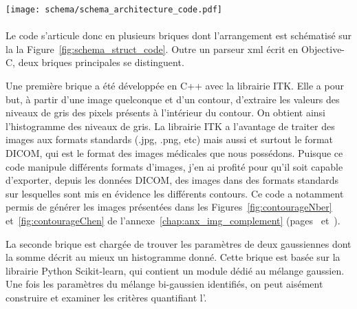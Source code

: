 \documentclass[main.tex]{subfiles}
\begin{document}
\begin{sidewaysfigure}
\centering
\vfill
\texttt{[image: schema/schema\_architecture\_code.pdf]} %
\caption{\label{fig:schema_struct_code}Schéma du code de calcul permettant la quantification de l'\hetero. Le code est très hétéroclite et fait intervenir plusieurs langages de programmation}
\end{sidewaysfigure}


\paragraph{}
Le code s'articule donc en plusieurs briques dont l'arrangement est schématisé sur la la Figure~\ref{fig:schema_struct_code}. Outre un parseur xml écrit en Objective-C, deux briques principales se distinguent. 


Une première brique a été développée en C++ avec la librairie ITK. 
Elle a pour but, à partir d'une image quelconque 
 et d'un contour, d'extraire les valeurs des niveaux de gris des pixels présents à l'intérieur du contour. On obtient ainsi l'histogramme des niveaux de gris. 
La librairie ITK a l'avantage de traiter des images aux formats standards (.jpg, .png, etc) mais aussi et surtout le format DICOM, qui est le format des images médicales que nous possédons. 
Puisque ce code manipule différents formats d'images, j'en ai profité pour qu'il soit capable d'exporter, depuis les données DICOM, des images dans des formats standards sur lesquelles sont mis en évidence les différents contours. 
Ce code a notamment permis de générer les images présentées dans les Figures~\ref{fig:contourageNber} et~\ref{fig:contourageChen} de l'annexe~\ref{chap:anx_img_complement} (pages~\pageref{fig:contourageNber}  et~\pageref{fig:contourageNber}).


La seconde brique est chargée de trouver les paramètres de deux gaussiennes dont la somme décrit au mieux un histogramme donné. 
Cette brique est basée sur la librairie Python Scikit-learn, qui contient un module dédié au mélange gaussien. Une fois les paramètres du mélange bi-gaussien identifiés, on peut aisément construire et examiner les critères quantifiant l'\hetero.
\end{document}
